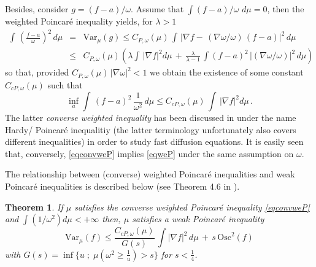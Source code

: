 \documentclass[11pt,reqno]{amsart}
\numberwithin{equation}{section}
\newtheorem{theorem}{Theorem}[section]
\theoremstyle{definition}
\theoremstyle{remark}
\def \Var {\textrm{Var}}
\def \Osc {\textrm{Osc}}
\begin{document}
Besides, consider $g=(f-a)/\omega$. Assume that $\int (f-a)/\omega \,\,  d\mu=0$, then the weighted Poincar\'e inequality yields, for $\lambda>1$
\begin{eqnarray*}
\int \, \left(\frac{f-a}{\omega}\right)^2 \, d\mu &=& \Var_\mu(g) \leq C_{P,\omega}(\mu) \, \int \, |\nabla f   -  \, (\nabla \omega/\omega) \, (f-a)|^2  \, d\mu \\ &\leq& C_{P,\omega}(\mu) \left(\lambda \int \, |\nabla f|^2 d\mu \, + \, \frac{\lambda}{\lambda-1} \, \int (f-a)^2 \, |(\nabla \omega/\omega)|^2  \, d\mu\right) 
\end{eqnarray*}
so that, provided $C_{P,\omega}(\mu) \, |\nabla \omega|^2 <1$ we obtain the existence of some constant $C_{cP,\omega}(\mu)$ such that 
\begin{equation*}
\inf_a \int \, (f-a)^2 \, \frac{1}{\omega^2} \, d\mu \leq C_{cP,\omega}(\mu) \, \int \, |\nabla f|^2 d\mu \, .
\end{equation*}
The latter \emph{converse weighted inequality} has been discussed in \cite{DMC,Adrienetal} under the name Hardy/ Poincar\'e inequalitiy (the latter terminology unfortunately also covers different inequalities) in order to study fast diffusion equations. It is easily seen that, conversely, \eqref{eqconvweP} implies \eqref{eqweP} under the same assumption on $\omega$. 


The relationship between (converse) weighted Poincar\'e inequalities and weak Poincar\'e inequalities is described below (see Theorem 4.6 in \cite{CGGR}).
\begin{theorem}\label{thmWPtoweP}
If $\mu$ satisfies the converse weighted Poincar\'e inequality \eqref{eqconvweP} and $\int (1/\omega^2) d\mu < +\infty$ then, $\mu$ satisfies a weak Poincar\'e inequality $$\Var_\mu(f) \leq \frac{C_{cP,\omega}(\mu)}{G(s)} \, \int |\nabla f|^2 \, d\mu \, + \, s \, \Osc^2(f)$$ with $G(s)=\inf\{u \; ; \; \mu(\omega^2 \geq \frac 1u)>s \}$ for $s<\frac 14$.
\end{theorem}
\end{document}
